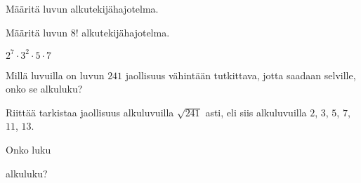 \begin{tehtava}
    Määritä luvun alkutekijähajotelma.
    
    \begin{alakohdat}
    \end{alakohdat}

    \begin{vastaus}
        \begin{alakohdat}
        \end{alakohdat}
    \end{vastaus}
    
\end{tehtava}

\begin{tehtava}
    Määritä luvun $8!$ alkutekijähajotelma.
    
    \begin{vastaus}
        $2^7\cdot 3^2\cdot 5\cdot 7$
    \end{vastaus}
    
\end{tehtava}

\begin{tehtava}
    Millä luvuilla on luvun $241$ jaollisuus vähintään tutkittava, jotta saadaan selville, onko se alkuluku?
    
    \begin{vastaus}
        Riittää tarkistaa jaollisuus alkuluvuilla $\sqrt{241}$ asti, eli siis alkuluvuilla $2$, $3$, $5$, $7$, $11$, $13$.
    \end{vastaus}
\end{tehtava}

\begin{tehtava}
    Onko luku
    \begin{alakohdat}
    \end{alakohdat}
    alkuluku?

    \begin{vastaus}
        \begin{alakohdat}
        \end{alakohdat}
    \end{vastaus}
    
\end{tehtava}

